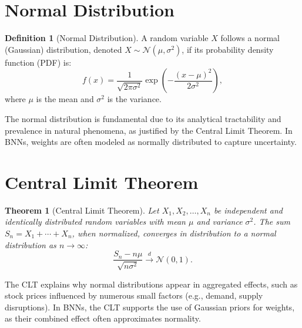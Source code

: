 \documentclass[12pt]{article}
\theoremstyle{plain}
\newtheorem{theorem}{Theorem}
\theoremstyle{definition}
\newtheorem{definition}{Definition}
\newcommand{\N}{\mathcal{N}}
\begin{document}
\section{Normal Distribution}
\begin{definition}[Normal Distribution]
A random variable \( X \) follows a normal (Gaussian) distribution, denoted \( X \sim \N(\mu, \sigma^2) \), if its probability density function (PDF) is:
\begin{equation}
f(x) = \frac{1}{\sqrt{2\pi\sigma^2}} \exp\left(-\frac{(x - \mu)^2}{2\sigma^2}\right),
\end{equation}
where \( \mu \) is the mean and \( \sigma^2 \) is the variance.
\end{definition}
The normal distribution is fundamental due to its analytical tractability and prevalence in natural phenomena, as justified by the Central Limit Theorem. In BNNs, weights are often modeled as normally distributed to capture uncertainty.

\section{Central Limit Theorem}
\begin{theorem}[Central Limit Theorem]
Let \( X_1, X_2, \ldots, X_n \) be independent and identically distributed random variables with mean \( \mu \) and variance \( \sigma^2 \). The sum \( S_n = X_1 + \cdots + X_n \), when normalized, converges in distribution to a normal distribution as \( n \to \infty \):
\begin{equation}
\frac{S_n - n\mu}{\sqrt{n\sigma^2}} \xrightarrow{d} \N(0, 1).
\end{equation}
\end{theorem}
The CLT explains why normal distributions appear in aggregated effects, such as stock prices influenced by numerous small factors (e.g., demand, supply disruptions). In BNNs, the CLT supports the use of Gaussian priors for weights, as their combined effect often approximates normality.
\end{document}
